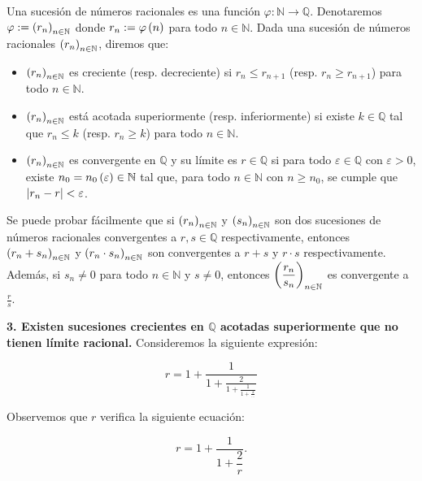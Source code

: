 \begin{definition}
  \rm Una sucesión de números racionales es una función $\varphi:\mathbb{N}\rightarrow\mathbb{Q}$. Denotaremos $\varphi:=\left(r_n\right)_{n\in\mathbb{N}}$ donde $r_n:=\varphi\left(n\right)$ para todo $n\in\mathbb{N}$. Dada una sucesión de números racionales $\left(r_n\right)_{n\in\mathbb{N}}$, diremos que:

  \begin{itemize}
    \item $\left(r_n\right)_{n\in\mathbb{N}}$ es creciente (resp. decreciente) si $r_n\leq r_{n+1}$ (resp. $r_n\geq r_{n+1}$) para todo $n\in\mathbb{N}$. %
    \item $\left(r_n\right)_{n\in\mathbb{N}}$ está acotada superiormente (resp. inferiormente) si existe $k\in\mathbb{Q}$ tal que $r_n\leq k$ (resp. $r_n\geq k$) para todo $n\in\mathbb{N}$. %
    \item $\left(r_n\right)_{n\in\mathbb{N}}$ es convergente en $\mathbb{Q}$ y su límite es $r\in\mathbb{Q}$ si para todo $\varepsilon\in\mathbb{Q}$ con $\varepsilon>0$, existe $n_0=n_0\left(\varepsilon\right)\in\mathbb{N}$ tal que, para todo $n\in\mathbb{N}$ con $n\geq n_0$, se cumple que $\left|r_n-r\right|<\varepsilon$.
  \end{itemize}
\end{definition}

Se puede probar fácilmente que si $\left(r_n\right)_{n\in\mathbb{N}}$ y $\left(s_n\right)_{n\in\mathbb{N}}$ son dos sucesiones de números racionales convergentes a $r,s\in\mathbb{Q}$ respectivamente, entonces $\left(r_n+s_n\right)_{n\in\mathbb{N}}$ y $\left(r_n\cdot s_n\right)_{n\in\mathbb{N}}$ son convergentes a $r+s$ y $r\cdot s$ respectivamente. Además, si $s_n\neq 0$ para todo $n\in\mathbb{N}$ y $s\neq 0$, entonces $\displaystyle\left(\frac{r_n}{s_n}\right)_{n\in\mathbb{N}}$ es convergente a $\frac{r}{s}$.

\textbf{3. Existen sucesiones crecientes en $\mathbb{Q}$ acotadas superiormente que no tienen límite racional. } Consideremos la siguiente expresión:

\begin{equation}
  r=1+\frac{1}{1+\frac{2}{1+\frac{1}{1+\frac{2}{\dots}}}}
\end{equation}

Observemos que $r$ verifica la siguiente ecuación:

\begin{equation}
  r=1+\frac{1}{1+\dfrac{2}{r}}.
\end{equation}

